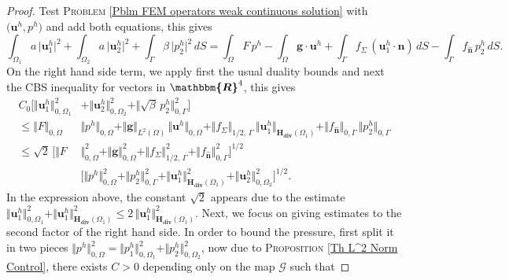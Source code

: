 \documentclass[3p]{elsarticle}
\def\g{\mathbf g}
\def\n{\bm{\widehat{ n} } }
\def\uh{\mathbf {u}^{h}}
\def\ph{p^{h}}
\def\uoneh{\mathbf{u}_{1}^{h}}
\def\utwoh{\mathbf{u}_{2}^{h}}
\def\R{\bm{\mathbbm{R} } }
\def\Hdiv{\mathbf{H_{div}}}
\def\poneh{p_{1}^{h}}
\def\ptwoh{p_{2}^{h}}
\def\flux{f_{\bm{\hat{n}} } }
\def\stress{f_{\Sigma } }
\def\map{\mathcal{G} }%
\def\Omeone{\Omega_{1}}
\def\Ometwo{\Omega_{2}}
\begin{document}
%
\begin{proof}
Test \textsc{Problem} \eqref{Pblm FEM operators weak continuous solution} with $\big(\uh, \ph\big)$ and add both equations, this gives
%
\begin{equation}\label{Eq Test on the FEM diagonal}
\int_{\Omega_1}  a \, \vert \uoneh \vert^{2} 
+ \int_{\Omega_2}  a \, \vert \utwoh \vert^{2} 
+ \int_{\Gamma}  \beta \, \vert \ptwoh \vert^{2} \, dS %
%
= \int_{\Omega }F\, \ph - \int_{\Omega } \g \cdot \uh
%
+ \int_{\Gamma} \stress\, (\uoneh\cdot\n)\, dS 
%
- \int_{\Gamma} \flux\, \ptwoh\, dS .
\end{equation}
%
On the right hand side term, we apply first the usual duality bounds and next the CBS inequality for vectors in $\R^{4}$, this gives
%
\begin{equation}\label{Ineq First a-priori Estimate}
%
\begin{split}
C_{0} \Big[ \Vert \uoneh \Vert^{2}_{0,\Omeone}  & 
+ \Vert \utwoh \Vert^{2}_{0, \Ometwo}  
+ \Vert \sqrt{\beta} \, \ptwoh \Vert^{2} _{0, \Gamma} \Big] \\
%
\leq \Vert F\Vert_{ 0, \Omega }\, & \Vert \ph\Vert_{ 0, \Omega } 
+ \Vert \g\Vert_{L^{2}(\Omega)}\, \Vert \uh\Vert_{0, \Omega } 
%
+ \Vert \stress \Vert_{1/2, \, \Gamma}\, \Vert \uoneh\Vert_{\Hdiv(\Omeone)} 
+ \Vert \flux \Vert_{ 0, \Gamma }\, \Vert \ptwoh\Vert_{ 0, \Gamma }  \\
%
\leq \sqrt{2} \, \Big[ \Vert F &  \Vert_{0, \Omega}^{2}
+ \Vert \g\Vert_{0, \Omega}^{2}
+ \Vert \stress \Vert_{1/2, \, \Gamma}^{2}
+ \Vert \flux \Vert_{0, \Gamma}^{2}\Big]^{1/2} \\
%
& \Big[\Vert \ph \Vert_{0, \Omega}^{2} 
+ \Vert \ptwoh\Vert_{0, \Gamma}^{2}
+ \Vert \uoneh\Vert_{\Hdiv(\Omeone)}^{2} 
+ \Vert \utwoh\Vert_{0, \Ometwo}^{2}\Big]^{1/2} .
\end{split}
\end{equation}
%
%
In the expression above, the constant $\sqrt{2}$ appears due to the estimate $\Vert \uoneh\Vert_{0, \Omeone}^{2}  + \Vert \uoneh\Vert_{\Hdiv(\Omeone)}^{2} \leq 2 \,  \Vert \uoneh\Vert_{\Hdiv(\Omeone)}^{2} $.
Next, we focus on giving estimates to the second factor of the right hand side. In order to bound the pressure, first split it in two pieces $\Vert \ph\Vert_{0, \Omega}^{2}  = \Vert \poneh\Vert_{0, \Omega_{1} }^{2}  + \Vert \ptwoh\Vert_{0, \Omega_{2} }^{2} $, now due to \textsc{Proposition} \ref{Th L^2 Norm Control}, there exists $C > 0$ depending only on the map $\map$ such that

\end{proof}
\end{document}
